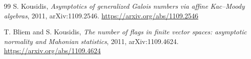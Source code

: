 \documentclass[11pt,openany]{book}
\numberwithin{equation}{chapter}
\theoremstyle{plain}
\theoremstyle{definition}
\theoremstyle{remark}
\begin{document}
\begin{thebibliography}{99}
S. Kousidis, \emph{Asymptotics of generalized Galois numbers via affine Kac--Moody algebras}, 2011, arXiv:1109.2546. \url{https://arxiv.org/abs/1109.2546}

T. Bliem and S. Kousidis, \emph{The number of flags in finite vector spaces: asymptotic normality and Mahonian statistics}, 2011, arXiv:1109.4624. \url{https://arxiv.org/abs/1109.4624}

\end{thebibliography}
\end{document}
